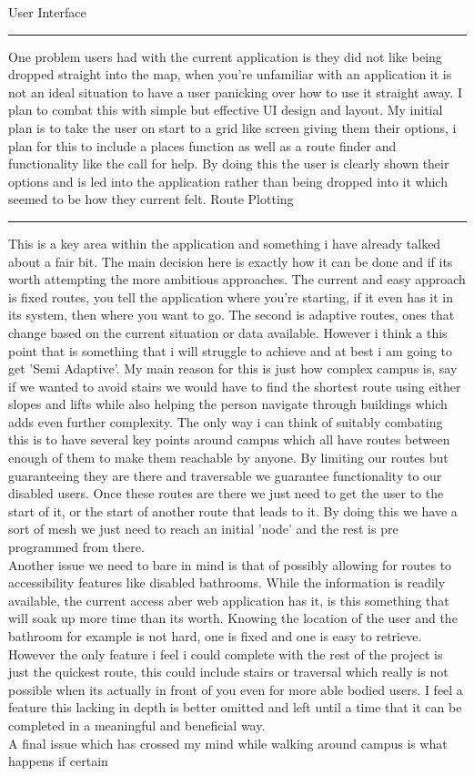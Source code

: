 \documentclass[10pt,a4paper]{article}
\begin{document}
\noindent
\large User Interface\\
\hrule
\vspace{0.2cm}
\noindent
One problem users had with the current application is they did not like being dropped straight into the map, when you're unfamiliar with an application it is not an ideal situation to have a user panicking over how to use it straight away. I plan to combat this with simple but effective UI design and layout. My initial plan is to take the user on start to a grid like screen giving them their options, i plan for this to include a places function as well as a route finder and functionality like the call for help. By doing this the user is clearly shown their options and is led into the application rather than being dropped into it which seemed to be how they current felt. 
\newpage
\noindent
\large Route Plotting\\
\hrule
\vspace{0.2cm}
\noindent
This is a key area within the application and something i have already talked about a fair bit. The main decision here is exactly how it can be done and if its worth attempting the more ambitious approaches. The current and easy approach is fixed routes, you tell the application where you're starting, if it even has it in its system, then where you want to go. The second is adaptive routes, ones that change based on the current situation or data available. However i think a this point that is something that i will struggle to achieve and at best i am going to get 'Semi Adaptive'. My main reason for this is just how complex campus is, say if we wanted to avoid stairs we would have to find the shortest route using either slopes  and lifts while also helping the person navigate through buildings which adds even further complexity. The only way i can think of suitably combating this is to have several key points around campus which all have routes between enough of them to make them reachable by anyone. By limiting our routes but guaranteeing they are there and traversable we guarantee functionality to our disabled users. Once these routes are there we just need to get the user to the start of it, or the start of another route that leads to it. By doing this we have a sort of mesh we just need to reach an initial 'node' and the rest is pre programmed from there.\\

\noindent
Another issue we need to bare in mind is that of possibly allowing for routes to accessibility features like disabled bathrooms. While the information is readily available, the current access aber web application has it, is this something that will soak up more time than its worth. Knowing the location of the user and the bathroom for example is not hard, one is fixed and one is easy to retrieve. However  the only feature i feel i could complete with the rest of the project is just the quickest route, this could include stairs or traversal which really is not possible when its actually in front of you even for more able bodied users. I feel a feature this lacking in depth is better omitted and left until a time that it can be completed in a meaningful and beneficial way. \\

\noindent
A final issue which has crossed my mind while walking around campus is what happens if certain 
\end{document}
